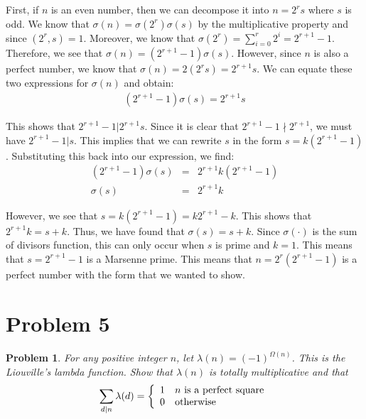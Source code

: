 \documentclass[psamsfonts]{amsart}
\newtheorem{prob}{Problem}[section]
\newenvironment{sol}{{\bfseries Solution}}{\qedsymbol}
\theoremstyle{definition}
\theoremstyle{remark}
\numberwithin{equation}{section}
\begin{document}
\begin{sol}
First, if $n$ is an even number, then we can decompose it into $n = 2^r s$ where $s$ is odd. We know that $\sigma(n) = \sigma(2^{r}) \sigma(s)$ by the multiplicative property and since $(2^{r}, s) = 1$. Moreover, we know that $\sigma(2^{r}) = \sum_{i=0}^r 2^i = 2^{r+1} - 1$. Therefore, we see that $\sigma(n) = (2^{r+1} - 1) \sigma(s)$. However, since $n$ is also a perfect number, we know that $\sigma(n) = 2 (2^r s) = 2^{r+ 1} s$. We can equate these two expressions for $\sigma(n)$ and obtain:
\begin{eqnarray}
(2^{r+1} - 1) \sigma(s) = 2^{r+1} s
\end{eqnarray}

This shows that $2^{r+1} - 1 | 2^{r+1} s$. Since it is clear that $2^{r+1} - 1 \nmid 2^{r+1}$, we must have $2^{r+1} - 1| s$. This implies that we can rewrite $s$ in the form $s = k (2^{r+1} - 1)$. Substituting this back into our expression, we find:
\begin{eqnarray}
(2^{r+1} - 1) \sigma(s) &=& 2^{r+1} k (2^{r+1} - 1) \\
\sigma(s) &=& 2^{r+1} k
\end{eqnarray}

However, we see that $s = k (2^{r+1} - 1) = k 2^{r+1} - k$. This shows that $2^{r+1} k = s + k$. Thus, we have found that $\sigma(s) = s + k$. Since $\sigma(\cdot)$ is the sum of divisors function, this can only occur when $s$ is prime and $k = 1$. This means that $s = 2^{r+1} - 1$ is a Marsenne prime. This means that $n = 2^{r} (2^{r+1} - 1)$ is a perfect number with the form that we wanted to show.   
\end{sol}

\section{Problem 5}

\begin{prob}
For any positive integer $n$, let $\lambda(n) = (-1)^{\Omega(n)}$. This is the Liouville's lambda function. Show that $\lambda(n)$ is totally multiplicative and that
\begin{equation}
\sum_{d|n} \lambda(d) = \left\{ \begin{array}{ l l}
1 & n \textrm{ is a perfect square} \\
0 & \textrm{otherwise}
\end{array} \right.
\end{equation}
\end{prob}
\end{document}
